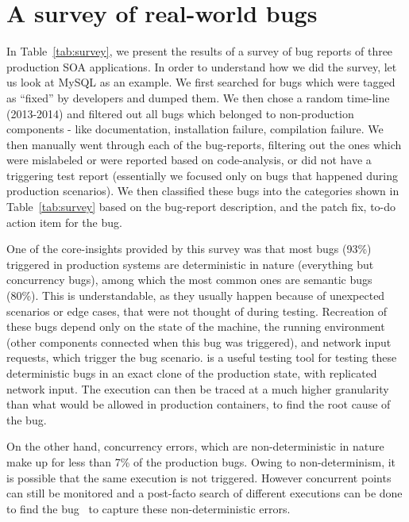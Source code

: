 \section{A survey of real-world bugs}
\label{sec:parikshanSurvey}


In Table~\ref{tab:survey}, we present the results of a survey of bug reports of three production SOA applications.
In order to understand how we did the survey, let us look at MySQL as an example.
We first searched for bugs which were tagged as ``fixed'' by developers and dumped them.
We then chose a random time-line (2013-2014) and filtered out all bugs which belonged to non-production components - like documentation, installation failure, compilation failure.
We then manually went through each of the bug-reports, filtering out the ones which were mislabeled or were reported based on code-analysis, or did not have a triggering test report (essentially we focused only on bugs that happened during production scenarios).
We then classified these bugs into the categories shown in Table~\ref{tab:survey} based on the bug-report description, and the patch fix, to-do action item for the bug.

One of the core-insights provided by this survey was that most bugs (93\%) triggered in production systems are deterministic in nature (everything but concurrency bugs), among which the most common ones are semantic bugs (80\%).
This is understandable, as they usually happen because of unexpected scenarios or edge cases, that were not thought of during testing.
Recreation of these bugs depend only on the state of the machine, the running environment (other components connected when this bug was triggered), and network input requests, which trigger the bug scenario.
\parikshan is a useful testing tool for testing these deterministic bugs in an exact clone of the production state, with replicated network input. 
The execution can then be traced at a much higher granularity than what would be allowed in production containers, to find the root cause of the bug. 

On the other hand, concurrency errors, which are non-deterministic in nature make up for less than 7\% of the production bugs.
Owing to non-determinism, it is possible that the same execution is not triggered. However concurrent points can still be monitored and a post-facto search of different executions can be done to find the bug~\cite{dpor,systematicDPORconcurrency} to capture these non-deterministic errors.\\ \\


